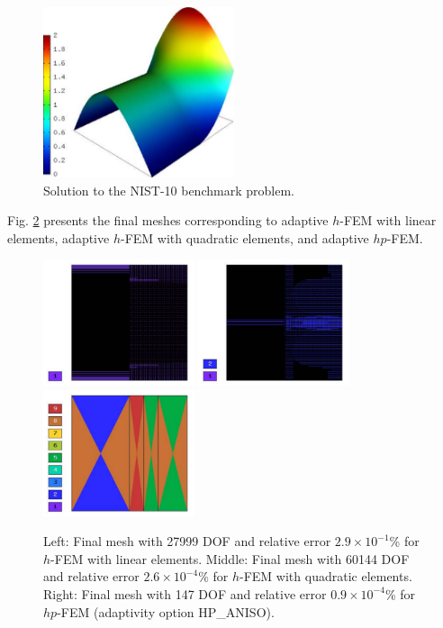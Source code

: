 \documentclass[12pt]{elsarticle}
\begin{document}
\begin{figure}[H]
\centering
\vspace{-6mm}
\includegraphics[height=5cm]{mafig59.pdf}
\vspace{-3mm}
\caption{Solution to the NIST-10 benchmark problem.}
\vspace{-3mm}
\label{fig:sln-nist10}
\end{figure}

Fig. \ref{fig:nist-10-hp-aniso} presents the final meshes corresponding to adaptive $h$-FEM with
linear elements, adaptive $h$-FEM with quadratic elements, and adaptive $hp$-FEM.

\begin{figure}[H]
\centering
\includegraphics[height=3.7cm]{mafig60.pdf}
\includegraphics[height=3.7cm]{mafig61.pdf}
\includegraphics[height=3.7cm]{mafig62.pdf}
\caption{
Left: Final mesh with 27999 DOF and relative error $2.9\times10^{-1}$\% for $h$-FEM with linear elements.
Middle: Final mesh with 60144 DOF and relative error $2.6\times10^{-4}$\% for $h$-FEM with quadratic elements.
Right: Final mesh with 147 DOF and relative error $0.9\times10^{-4}$\% for $hp$-FEM (adaptivity option HP\_ANISO).}
\label{fig:nist-10-hp-aniso}
\end{figure}
\end{document}

